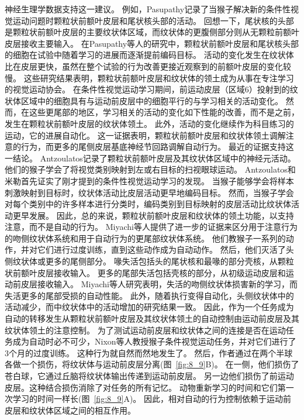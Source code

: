 神经生理学数据支持这一建议。
例如，Pasupathy\cite{pasupathy2005different}记录了当猴子解决新的条件性视觉运动问题时颗粒状前额叶皮层和尾状核头部的活动。
回想一下，尾状核的头部是颗粒状前额叶皮层的主要纹状体区域，而纹状体的更腹侧部分则从无颗粒前额叶皮层接收主要输入。
在Pasupathy等人的研究中，颗粒状前额叶皮层和尾状核头部的细胞在试验中随着学习的进展而逐渐提前编码目标。
活动的变化发生在纹状体比在皮层更快，虽然在整个试验的行为改善更接近观察到的前额叶皮层的变化较慢。
这些研究结果表明，颗粒状前额叶皮层和纹状体的领土成为从事在专注学习的视觉运动协会。
在条件性视觉运动学习期间，前运动皮层（区域6）投射到的纹状体区域中的细胞具有与运动前皮层中的细胞平行的与学习相关的活动变化\cite{brasted2004comparison}。
然而，在这些更尾部的地区，学习相关的活动的变化如下性能的改善，而不是之前，发生在颗粒状前额叶皮层的纹状体领土。
此外，活动的变化继续作为科目练习的运动，它的进展自动化。
这一证据表明，颗粒状前额叶皮层和纹状体领土调解注意的行为，而更多的尾侧皮层基底神经节回路调解自动行为。
最近的证据支持这一结论。
Antzoulatos\cite{antzoulatos2011differences}记录了颗粒状前额叶皮层及其纹状体区域中的神经元活动。
他们的猴子学会了将视觉类别映射到左或右目标的扫视眼球运动。
Antzoulatos和米勒首先证实了刚才提到的条件性视觉运动学习的发现。
当猴子能够学会将样本刺激映射到目标时，纹状体活动比皮层活动更早地编码目标。
然而，当猴子学会对每个类别中的许多样本进行分类时，编码类别到目标映射的皮层活动比纹状体活动更早发展。
因此，总的来说，颗粒状前额叶皮层和纹状体的领土功能，以支持注意，而不是自动的行为。
Miyachi等人\cite{miyachi1997differential}提供了进一步的证据来区分用于注意行为的吻侧纹状体系统和用于自动行为的更尾部纹状体系统。
他们教猴子一系列的动作，并对它们进行过度训练，直到这些动作成为自动动作。
然后，他们灭活了头侧纹状体或更多的尾侧部分。
喙失活包括头的尾状核和最喙的部分壳核，从颗粒状前额叶皮层接收输入。
更多的尾部失活包括壳核的部分，从初级运动皮层和运动前皮层接收输入。
Miyachi等人研究表明，失活的吻侧纹状体损害新的学习，而失活更多的尾部受损的自动性能。
此外，随着执行变得自动化，头侧纹状体中的活动减少，而中纹状体中的活动增加\cite{miyachi2002differential,brasted2004comparison}的研究结果一致。
因此，作为一个任务成为自动的转移发生从颗粒状前额叶皮层及其纹状体领土的自动控制由运动前皮层及其纹状体领土的注意控制。
为了测试运动前皮层和纹状体之间的连接是否在运动任务成为自动时必不可少，Nixon等人\cite{nixon2004cortico}教授猴子条件视觉运动任务，并对它们进行了3个月的过度训练。
这种行为就自然而然地发生了。
然后，作者通过在两个半球各做一个损伤，将纹状体与运动前皮层分离(图~\ref{fig:8_9}B)。
在一侧，他们损伤了苍白球，它通过丘脑将纹状体输出传递到运动前皮层。
另一边他们损伤了前运动皮层。这种结合损伤消除了对任务的所有记忆。
动物重新学习的时间和它们第一次学习的时间一样长(图~\ref{fig:8_9}A)。
因此，相对自动的行为控制依赖于运动前皮层和纹状体区域之间的相互作用。


